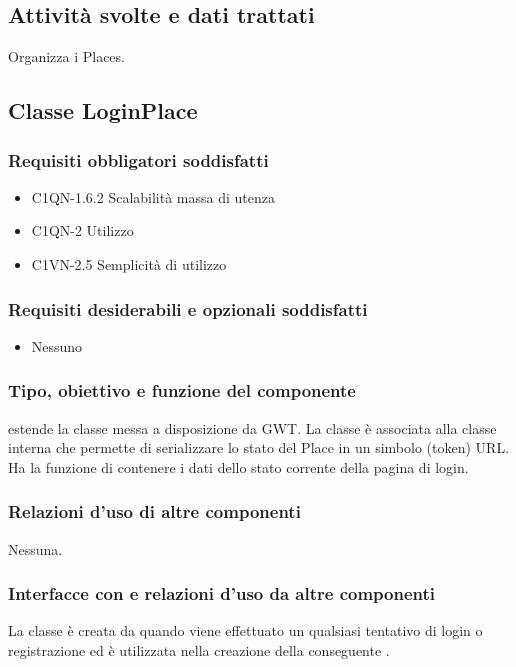 \subsection*{Attivit\`a svolte e dati trattati} Organizza i Places.

\subsection{Classe LoginPlace}
\subsubsection*{Requisiti obbligatori soddisfatti}
\begin{itemize}
	\item C1QN-1.6.2 Scalabilit\`a massa di utenza
	\item C1QN-2 Utilizzo
	\item C1VN-2.5 Semplicit\`a di utilizzo
\end{itemize}
\subsubsection*{Requisiti desiderabili e opzionali soddisfatti}
\begin{itemize}
    \item Nessuno
\end{itemize}
\subsubsection*{Tipo, obiettivo e funzione del componente}
 estende la classe  messa a disposizione da GWT. La
classe \`e associata alla classe interna  che permette di
serializzare lo stato del Place in un simbolo (token) URL.
Ha la funzione di contenere i dati dello stato corrente della pagina di login.
\subsubsection*{Relazioni d'uso di altre componenti}
Nessuna.
\subsubsection*{Interfacce con e relazioni d'uso da altre componenti}
La classe \`e creata da  quando viene effettuato un qualsiasi
tentativo di login o registrazione ed \`e utilizzata nella creazione della
conseguente . 
